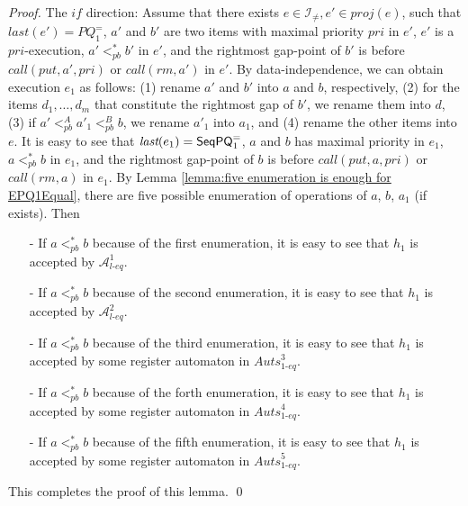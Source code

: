 \begin {proof}
\noindent The $\textit{if}$ direction: Assume that there exists $e \in \mathcal{I}_{\neq},e' \in \textit{proj}(e)$, such that $last(e')=\textit{PQ}_1^{=}$, $a'$ and $b'$ are two items with maximal priority $\textit{pri}$ in $e'$, $e'$ is a $\textit{pri}$-execution, $a' <_{\textit{pb}}^* b'$ in $e'$, and the rightmost gap-point of $b'$ is before $\textit{call}(\textit{put},a',\textit{pri})$ or $\textit{call}(\textit{rm},a')$ in $e'$. By data-independence, we can obtain execution $e_1$ as follows: (1) rename $a'$ and $b'$ into $a$ and $b$, respectively, (2) for the items $d_1,\ldots,d_m$ that constitute the rightmost gap of $b'$, we rename them into $d$, (3) if $a' <_{\textit{pb}}^A a'_1 <_{\textit{pb}}^B b$, we rename $a'_1$ into $a_1$, and (4) rename the other items into $e$. It is easy to see that $\textit{last}(e_1) = \mathsf{SeqPQ}_1^{=}$, $a$ and $b$ has maximal priority in $e_1$, $a <_{\textit{pb}}^* b$ in $e_1$, and the rightmost gap-point of $b$ is before $\textit{call}(\textit{put},a,\textit{pri})$ or $\textit{call}(\textit{rm},a)$ in $e_1$. By Lemma \ref{lemma:five enumeration is enough for EPQ1Equal}, there are five possible enumeration of operations of $a$, $b$, $a_1$ (if exists). Then


\begin{itemize}
\setlength{\itemsep}{0.5pt}
\item[-] If $a <_{\textit{pb}}^* b$ because of the first enumeration, it is easy to see that $h_1$ is accepted by $\mathcal{A}_{\textit{l-eq}}^1$.

\item[-] If $a <_{\textit{pb}}^* b$ because of the second enumeration, it is easy to see that $h_1$ is accepted by $\mathcal{A}_{\textit{l-eq}}^2$.

\item[-] If $a <_{\textit{pb}}^* b$ because of the third enumeration, it is easy to see that $h_1$ is accepted by some register automaton in $\textit{Auts}_{\textit{1-eq}}^{3}$.

\item[-] If $a <_{\textit{pb}}^* b$ because of the forth enumeration, it is easy to see that $h_1$ is accepted by some register automaton in $\textit{Auts}_{\textit{1-eq}}^{4}$.

\item[-] If $a <_{\textit{pb}}^* b$ because of the fifth enumeration, it is easy to see that $h_1$ is accepted by some register automaton in $\textit{Auts}_{\textit{1-eq}}^{5}$.
\end{itemize}

This completes the proof of this lemma. \qed
\end {proof}





